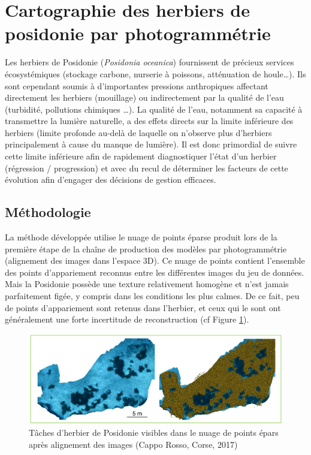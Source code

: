\section*{Cartographie des herbiers de posidonie par photogrammétrie}

Les herbiers de Posidonie (\textit{Posidonia oceanica}) fournissent de précieux services écosystémiques (stockage carbone, nurserie à poissons, atténuation de houle…). Ils sont cependant soumis à d’importantes pressions anthropiques affectant directement les herbiers (mouillage) ou indirectement par la qualité de l’eau (turbidité, pollutions chimiques …). La qualité de l’eau, notamment sa capacité à transmettre la lumière naturelle, a des effets directs sur la limite inférieure des herbiers (limite profonde au-delà de laquelle on n’observe plus d’herbiers principalement à cause du manque de lumière). Il est donc primordial de suivre cette limite inférieure afin de rapidement diagnostiquer l’état d’un herbier (régression / progression) et avec du recul de déterminer les facteurs de cette évolution afin d’engager des décisions de gestion efficaces.


\subsection*{Méthodologie}
La méthode développée utilise le nuage de points éparse produit lors de la première étape de la chaîne de production des modèles par photogrammétrie (alignement des images dans l’espace 3D). Ce nuage de points contient l’ensemble des points d’appariement reconnus entre les différentes images du jeu de données. Mais la Posidonie possède une texture relativement homogène et n’est jamais parfaitement figée, y compris dans les conditions les plus calmes. De ce fait, peu de points d’appariement sont retenus dans l’herbier, et ceux qui le sont ont généralement une forte incertitude de reconstruction (cf Figure \ref{figureB.1}).

\begin{figure}[htpb]
	\begin{center}
	\includegraphics[width=\linewidth]{images/appendix_merigeo/Figure1.png}
		\caption[Tâches d’herbier de Posidonie visibles dans le nuage de points épars]{Tâches d’herbier de Posidonie visibles dans le nuage de points épars après alignement des images (Cappo Rosso, Corse, 2017)}
	\label{figureB.1}
\end{center}
\end{figure}

